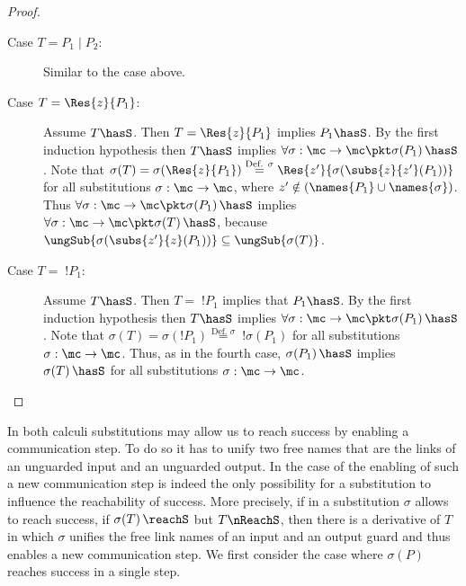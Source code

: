 \documentclass[]{article}
\begin{document}
\begin{proof}
\begin{description}
\begin{description}
				\item[Case $ T = P_1 \mid P_2 $:] Similar to the case above.\item[Case $ T = \Res{z}{P_1} $:] Assume $ T \hasS $. Then $ T = \Res{z}{P_1} $ implies $ P_1 \hasS $. By the first induction hypothesis then $ T \hasS $ implies $ \forall \sigma : \mc \to \mc \pkt \sigma\!\left( P_1 \right) \hasS $. Note that $ \sigma\!\left( T \right) = \sigma\!\left( \Res{z}{P_1} \right) \stackrel{\text{Def. } \sigma}{=} \Res{z'}{\sigma\!\left( \subs{z}{z'}\!\left( P_1 \right) \right)} $ for all substitutions $ \sigma : \mc \to \mc $, where $ z' \notin \left( \names{P_1} \cup \names{\sigma} \right) $. Thus $ \forall \sigma : \mc \to \mc \pkt \sigma\!\left( P_1 \right) \hasS $ implies $ \forall \sigma : \mc \to \mc \pkt \sigma\!\left( T \right) \hasS $, because $ \ungSub{\sigma\!\left( \subs{z'}{z}\!\left( P_1 \right) \right)} \subseteq \ungSub{\sigma\!\left( T \right)} $.
				\item[Case $ T = \; !P_1 $:] Assume $ T \hasS $. Then $ T = \; !P_1 $ implies that $ P_1 \hasS $. By the first induction hypothesis then $ T \hasS $ implies $ \forall \sigma : \mc \to \mc \pkt \sigma\!\left( P_1 \right) \hasS $. Note that $ \sigma\!\left( T \right) = \sigma\!\left( !P_1 \right) \stackrel{\text{Def. } \sigma}{=} \; !\sigma\!\left( P_1 \right) $ for all substitutions $ \sigma : \mc \to \mc $. Thus, as in the fourth case, $ \sigma\!\left( P_1 \right) \hasS $ implies $ \sigma\!\left( T \right) \hasS $ for all substitutions $ \sigma : \mc \to \mc $.
			\end{description}
	\end{description}
\end{proof}

In both calculi substitutions may allow us to reach success by enabling a communication step. To do so it has to unify two free names that are the links of an unguarded input and an unguarded output. In the case of \piNM the enabling of such a new communication step is indeed the only possibility for a substitution to influence the reachability of success.
More precisely, if in \piNM a substitution $ \sigma $ allows to reach success, \ie if $ \sigma\!\left( T \right) \reachS $ but $ T \nReachS $, then there is a derivative of $ T $ in which $ \sigma $ unifies the free link names of an input and an output guard and thus enables a new communication step.
We first consider the case where $ \sigma\!\left( P \right) $ reaches success in a single step.
\end{document}
